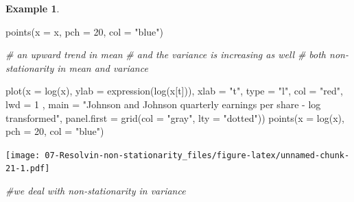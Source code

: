 \documentclass[
]{book}
\newenvironment{Shaded}{\begin{snugshade}}{\end{snugshade}}
\newcommand{\AttributeTok}[1]{\textcolor[rgb]{0.77,0.63,0.00}{#1}}
\newcommand{\CommentTok}[1]{\textcolor[rgb]{0.56,0.35,0.01}{\textit{#1}}}
\newcommand{\DecValTok}[1]{\textcolor[rgb]{0.00,0.00,0.81}{#1}}
\newcommand{\FunctionTok}[1]{\textcolor[rgb]{0.00,0.00,0.00}{#1}}
\newcommand{\NormalTok}[1]{#1}
\newcommand{\StringTok}[1]{\textcolor[rgb]{0.31,0.60,0.02}{#1}}
\theoremstyle{definition}
\theoremstyle{definition}
\newtheorem{example}{Example}[chapter]
\theoremstyle{definition}
\theoremstyle{definition}
\theoremstyle{remark}
\begin{document}
\begin{example}
\begin{Shaded}
\begin{Highlighting}[]
\FunctionTok{points}\NormalTok{(}\AttributeTok{x =}\NormalTok{ x, }\AttributeTok{pch =} \DecValTok{20}\NormalTok{, }\AttributeTok{col =} \StringTok{"blue"}\NormalTok{)}


\CommentTok{\# an upward trend in mean}
\CommentTok{\# and the variance is increasing as well}
\CommentTok{\# both non{-}stationarity in mean and variance}
\end{Highlighting}
\end{Shaded}

\begin{Shaded}
\begin{Highlighting}[]
\FunctionTok{plot}\NormalTok{(}\AttributeTok{x =} \FunctionTok{log}\NormalTok{(x), }\AttributeTok{ylab =} \FunctionTok{expression}\NormalTok{(}\FunctionTok{log}\NormalTok{(x[t])), }\AttributeTok{xlab =} \StringTok{"t"}\NormalTok{, }\AttributeTok{type =} \StringTok{"l"}\NormalTok{, }\AttributeTok{col =} \StringTok{"red"}\NormalTok{, }\AttributeTok{lwd =} \DecValTok{1}\NormalTok{ , }
     \AttributeTok{main =} \StringTok{"Johnson and Johnson quarterly earnings per share {-} log transformed"}\NormalTok{, }
     \AttributeTok{panel.first =} \FunctionTok{grid}\NormalTok{(}\AttributeTok{col =} \StringTok{"gray"}\NormalTok{, }\AttributeTok{lty =} \StringTok{"dotted"}\NormalTok{))}
\FunctionTok{points}\NormalTok{(}\AttributeTok{x =} \FunctionTok{log}\NormalTok{(x), }\AttributeTok{pch =} \DecValTok{20}\NormalTok{, }\AttributeTok{col =} \StringTok{"blue"}\NormalTok{)}
\end{Highlighting}
\end{Shaded}

\texttt{[image: 07-Resolvin-non-stationarity\_files/figure-latex/unnamed-chunk-21-1.pdf]}

\begin{Shaded}
\begin{Highlighting}[]
\CommentTok{\#we deal with non{-}stationarity in variance}
\end{Highlighting}
\end{Shaded}


\end{example}
\end{document}
